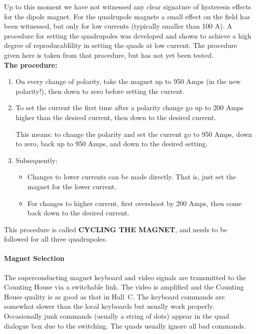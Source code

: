 {Up to this moment we have not witnessed any clear signature of hysteresis
effects for the dipole magnet. For the quadrupole magnets a small effect
on the field has been witnessed, but only for low currents (typically smaller
than 100 A). A procedure for setting the quadrupoles was developed
and shown to achieve a high
degree of reproducablility in setting the quads at low current.  The procedure
given here is taken from that procedure, but has not yet  been tested.\\
\textbf{The procedure:} 
\begin{enumerate}
  \item{On every change of polarity, take the magnet up to 950 Amps 
     (in the new polarity!), then down to zero before setting the
     current.} 
  \item{To set the current the first time after a polarity change 
     go up to 200 Amps higher than the desired current, 
     then down to the desired current.

     This means: to change the polarity and set the current go to 950 Amps,
     down to zero, back up to 950 Amps, and down to the desired setting.}
  \item{Subsequently:
  \begin{itemize}
     \item{Changes to lower currents can be made directly. 
        That is, just set the magnet for the lower current.}
     \item{For changes to higher current, first overshoot 
        by 200 Amps, then come back down to the desired current.}
  \end{itemize}}
\end{enumerate} 
This procedure is called \textbf{CYCLING
THE MAGNET}, and needs to be  followed for all three quadrupoles.

\begin{obsolete}
\paragraph{Magnet Selection}

The superconducting magnet keyboard and video signals are transmitted to
the Counting House via a switchable link.  The video is amplified and
the Counting House quality is as good as that in Hall~C.  The keyboard
commands are somewhat slower than the local keyboards but usually work
properly.  Occasionally junk commands (usually a string of dots) appear
in the quad dialogue box due to the switching.  The quads usually ignore
all bad commands.


\end{obsolete}}
